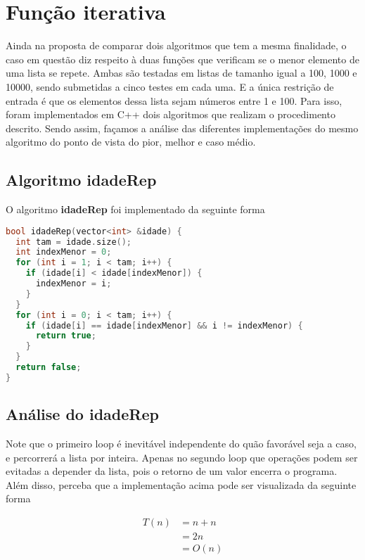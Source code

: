 \section{Função iterativa}
\label{sec:func-it}

Ainda na proposta de comparar dois algoritmos que tem a mesma finalidade, o caso em questão diz respeito à duas funções que verificam se o menor elemento de uma lista se repete. Ambas são testadas em listas de tamanho igual a 100, 1000 e 10000, sendo submetidas a cinco testes em cada uma. E a única restrição de entrada é que os elementos dessa lista sejam números entre 1 e 100. Para isso, foram implementados em C++ dois algoritmos que realizam o procedimento descrito. Sendo assim, façamos a análise das diferentes implementações do mesmo algoritmo do ponto de vista do pior, melhor e caso médio.

\subsection{Algoritmo idadeRep}

O algoritmo \textbf{idadeRep} foi implementado da seguinte forma

\begin{lstlisting}[language=C++]
bool idadeRep(vector<int> &idade) {
  int tam = idade.size();
  int indexMenor = 0;
  for (int i = 1; i < tam; i++) {
    if (idade[i] < idade[indexMenor]) {
      indexMenor = i;
    }
  }
  for (int i = 0; i < tam; i++) {
    if (idade[i] == idade[indexMenor] && i != indexMenor) {
      return true;
    }
  }
  return false;
}
\end{lstlisting}
\FloatBarrier

\subsection{Análise do idadeRep}

Note que o primeiro loop é inevitável independente do quão favorável seja a caso, e percorrerá a lista por inteira. Apenas no segundo loop que operações podem ser evitadas a depender da lista, pois o retorno de um valor encerra o programa. Além disso, perceba que a implementação acima pode ser visualizada da seguinte forma

\begin{align*}
  T(n) & = n + n\\ 
       & = 2n \\
       & = O(n)
\end{align*}

